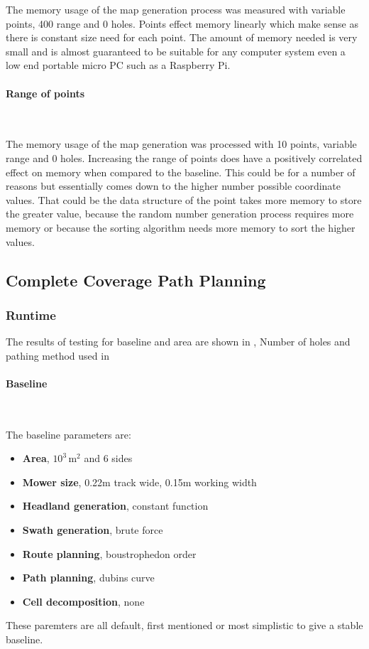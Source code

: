 \documentclass[final]{cmpreport_02}
\begin{document}
The memory usage of the map generation process was measured with variable points, 400 range and 0 holes.
Points effect memory linearly which make sense as there is constant size need for each point.
The amount of memory needed is very small and is almost guaranteed to be suitable for any computer system even a low end portable micro PC such as a Raspberry Pi.


\paragraph{Range of points} \

The memory usage of the map generation was processed with 10 points, variable range and 0 holes.
Increasing the range of points does have a positively correlated effect on memory when compared to the baseline.
This could be for a number of reasons but essentially comes down to the higher number possible coordinate values.
That could be the data structure of the point takes more memory to store the greater value, because the random number generation process requires more memory or because the sorting algorithm needs more memory to sort the higher values.


\subsection{Complete Coverage Path Planning}
\subsubsection{Runtime}
The results of testing for baseline and area are shown in , Number of holes and pathing method used in 

\paragraph{Baseline} \

The baseline parameters are:

\begin{itemize}
	\item{\textbf{Area}, $10^3\,\text{m}^2$ and 6 sides}
	\item{\textbf{Mower size}, 0.22m track wide, 0.15m working width}
	\item{\textbf{Headland generation}, constant function}
	\item{\textbf{Swath generation}, brute force}
	\item{\textbf{Route planning}, boustrophedon order}
	\item{\textbf{Path planning}, dubins curve}
	\item{\textbf{Cell decomposition}, none}
\end{itemize}
These paremters are all default, first mentioned or most simplistic to give a stable baseline.
\end{document}
